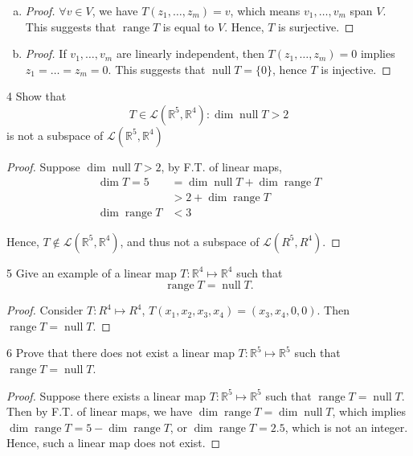 \documentclass{article}
\newenvironment{problem}[1]{\begin{prob*}{#1}{}}{\end{prob*}}
\newcommand{\R}{\mathbb{R}}
\newcommand{\Hom}{\mathcal{L}}
\DeclareMathOperator{\Null}{null}
\DeclareMathOperator{\Range}{range}
\begin{document}
\begin{enumerate}[(a)]
	\item \begin{proof}
		      \(\forall v \in V\), we have \(T(z_1, \dots, z_m) = v\), which means \(v_1, \dots, v_m\) span $V$. This suggests that $\Range T$ is equal to $V$. Hence, $T$ is surjective.
	      \end{proof}
	\item \begin{proof}
		      If \(v_1, \dots, v_m\) are linearly independent, then \(T(z_1, \dots, z_m) = 0\) implies \(z_1 = \dots = z_m = 0\). This suggests that $\Null T = \{0\}$, hence $T$ is injective.
	      \end{proof}
\end{enumerate}

\begin{problem}{4}
Show that \[
	{T \in \Hom(\R^5, \R^4) : \dim \Null T > 2}\]
is not a subspace of \(\Hom (\R^5,\R^4)\)
\end{problem}

\begin{proof}
	Suppose \(\dim \Null T > 2\), by F.T. of linear maps,
	\begin{align*}
		\dim T = 5    & = \dim \Null T + \dim \Range T \\
		              & > 2 + \dim \Range T            \\
		\dim \Range T & < 3
	\end{align*}

	Hence, $T \notin \Hom(\R^5, \R^4)$, and thus not a subspace of \(\Hom (R^5, R^4)\).
\end{proof}

\begin{problem}{5}
Give an example of a linear map \(T : \R^4 \mapsto \R^4\) such that \[
	\Range T = \Null T.\]
\end{problem}

\begin{proof}
	Consider \(T : R^4 \mapsto R^4\), \(T(x_1, x_2, x_3, x_4) = (x_3, x_4, 0, 0)\). Then \(\Range T = \Null T\).
\end{proof}

\begin{problem}{6}
Prove that there does not exist a linear map \(T : \R^5 \mapsto \R^5 \) such that \(\Range T = \Null T\).
\end{problem}

\begin{proof}
	Suppose there exists a linear map \(T: \R^5 \mapsto \R^5\) such that \(\Range T = \Null T\). Then by F.T. of linear maps, we have \(\dim \Range T = \dim \Null T\), which implies \(\dim \Range T = 5 - \dim \Range T\), or \(\dim \Range T = 2.5\), which is not an integer. Hence, such a linear map does not exist.
\end{proof}
\end{document}
